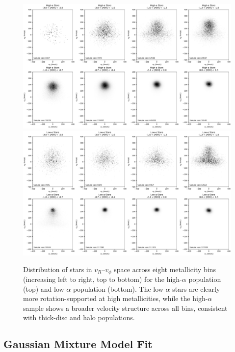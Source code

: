 \documentclass[a4paper,12pt]{article}
\begin{document}
\begin{figure}[H]
  \centering
  \includegraphics[width=\textwidth]{../figures/high_alpha.png}
  \vspace{0.5em}
  \includegraphics[width=\textwidth]{../figures/low_alpha.png}
  \caption{Distribution of stars in $v_R$–$v_\phi$ space across eight metallicity bins
           (increasing left to right, top to bottom) for the high-$\alpha$ population (top)
           and low-$\alpha$ population (bottom). The low-$\alpha$ stars are clearly more
           rotation-supported at high metallicities, while the high-$\alpha$ sample shows a
           broader velocity structure across all bins, consistent with thick-disc and halo populations.}
  \label{fig:vr_vphi_alpha}
\end{figure}

\subsection{Gaussian Mixture Model Fit}
\end{document}
